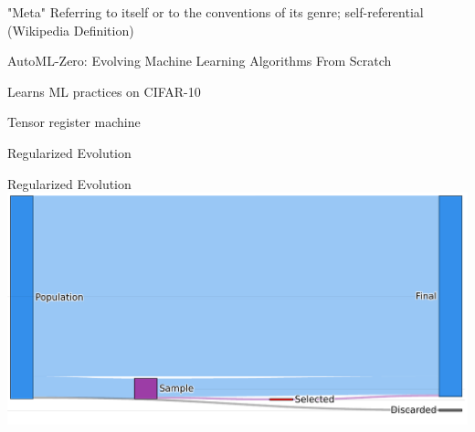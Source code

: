 \documentclass[aspectratio=169]{beamer}
\makeatletter
\newcommand{\white}[1]{{\color{pureminimalistic@text@white} #1}}
\newcommand{\red}[1]{{\color{pureminimalistic@text@red} #1}}
\newcommand{\cb}[1]{{\color{c2} #1}}
\newcommand{\cc}[1]{{\color{c3} #1}}
\newcommand{\ce}[1]{{\color{c4} #1}}
\newcommand{\gr}[1]{{\color{grey} #1}}
\makeatother
\begin{document}
\begin{frame}[plain]{}
  \centering
  \vfill
  \red{\fontsize{40}{50}\selectfont "Meta"}
  \vfill
  \Large Referring to itself or to the conventions of its genre; \cc{self-referential} \gr{(Wikipedia Definition)}
\end{frame}

\begin{frame}{AutoML-Zero: Evolving Machine Learning Algorithms From Scratch \white{\cite{real2020automl}}}
    \begin{vfilleditems}
        \item \cb{\Huge Learns ML practices on CIFAR-10}
        \vspace{0.7em}
        \item \cc{\Huge Tensor register machine}
        \vspace{0.7em}
        \item \ce{\Huge Regularized Evolution}
    \end{vfilleditems}
\end{frame}

\begin{frame}{Regularized Evolution}
    \includegraphics[width=0.95\linewidth, keepaspectratio]{figures/regev.pdf}
\end{frame}
\end{document}
